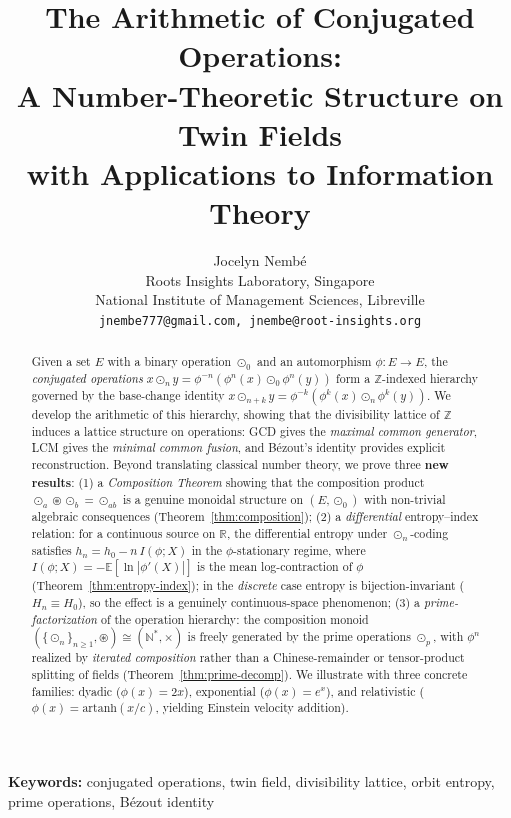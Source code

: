 \documentclass[11pt,twocolumn]{article}
\title{\textbf{The Arithmetic of Conjugated Operations:\\A Number-Theoretic Structure on Twin Fields\\with Applications to Information Theory}}
\author{Jocelyn Nemb\'e\\
\small Roots Insights Laboratory, Singapore\\
\small National Institute of Management Sciences, Libreville\\
\small \texttt{jnembe777@gmail.com, jnembe@root-insights.org}}
\date{}
\theoremstyle{plain}
\theoremstyle{definition}
\theoremstyle{remark}
\newcommand{\N}{\mathbb{N}}
\newcommand{\Z}{\mathbb{Z}}
\newcommand{\R}{\mathbb{R}}
\begin{document}
\maketitle

\begin{abstract}
Given a set $E$ with a binary operation $\odot_0$ and an automorphism $\phi: E \to E$, the \emph{conjugated operations} $x \odot_n y = \phi^{-n}(\phi^n(x) \odot_0 \phi^n(y))$ form a $\Z$-indexed hierarchy governed by the base-change identity $x \odot_{n+k} y = \phi^{-k}(\phi^k(x) \odot_n \phi^k(y))$.
We develop the arithmetic of this hierarchy, showing that the divisibility lattice of $\Z$ induces a lattice structure on operations: GCD gives the \emph{maximal common generator}, LCM gives the \emph{minimal common fusion}, and B\'ezout's identity provides explicit reconstruction.
Beyond translating classical number theory, we prove three \textbf{new results}: (1) a \emph{Composition Theorem} showing that the composition product $\odot_a \circledast \odot_b = \odot_{ab}$ is a genuine monoidal structure on $(E, \odot_0)$ with non-trivial algebraic consequences (Theorem~\ref{thm:composition}); (2) a \emph{differential} entropy--index relation: for a continuous source on $\R$, the differential entropy under $\odot_n$-coding satisfies $h_n = h_0 - n\,I(\phi;X)$ in the $\phi$-stationary regime, where $I(\phi;X) = -\mathbb{E}[\ln|\phi'(X)|]$ is the mean log-contraction of $\phi$ (Theorem~\ref{thm:entropy-index}); in the \emph{discrete} case entropy is bijection-invariant ($H_n \equiv H_0$), so the effect is a genuinely continuous-space phenomenon; (3) a \emph{prime-factorization} of the operation hierarchy: the composition monoid $(\{\odot_n\}_{n\geq1},\circledast)\cong(\N^*,\times)$ is freely generated by the prime operations $\odot_p$, with $\phi^n$ realized by \emph{iterated composition} rather than a Chinese-remainder or tensor-product splitting of fields (Theorem~\ref{thm:prime-decomp}).
We illustrate with three concrete families: dyadic ($\phi(x) = 2x$), exponential ($\phi(x) = e^x$), and relativistic ($\phi(x) = \mathrm{artanh}(x/c)$, yielding Einstein velocity addition).
\end{abstract}

\noindent\textbf{Keywords:} conjugated operations, twin field, divisibility lattice, orbit entropy, prime operations, B\'ezout identity


\end{document}
